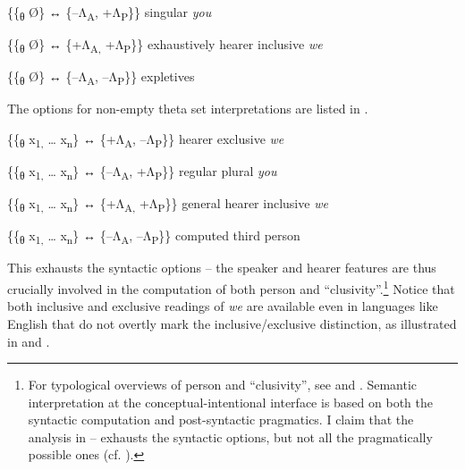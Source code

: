 \documentclass[output=paper]{LSP/langsci}
\begin{document}
\ex  \{\{\textsubscript{θ} Ø\} ↔ \{–Λ\textsubscript{A}, +Λ\textsubscript{P}\}\}  \hspace{2em} singular \textit{you}

\ex  \{\{\textsubscript{θ} Ø\} ↔ \{+Λ\textsubscript{A,} +Λ\textsubscript{P}\}\}  \hspace{2em} exhaustively hearer inclusive \textit{we}

\ex  \{\{\textsubscript{θ} Ø\} ↔ \{–Λ\textsubscript{A}, –Λ\textsubscript{P}\}\}  \hspace{2em} expletives
\z
\z

The options for non-empty theta set interpretations are listed in .

\ea%
    \label{ex:Sigurdsson:31}
\ea  \{\{\textsubscript{θ} x\textsubscript{1,} … x\textsubscript{n}\} ↔ \{+Λ\textsubscript{A}, –Λ\textsubscript{P}\}\} \hspace{2em} hearer exclusive \textit{we}

\ex  \{\{\textsubscript{θ} x\textsubscript{1,} … x\textsubscript{n}\} ↔ \{–Λ\textsubscript{A}, +Λ\textsubscript{P}\}\} \hspace{2em} regular plural \textit{you}

\ex  \{\{\textsubscript{θ} x\textsubscript{1,} … x\textsubscript{n}\} ↔ \{+Λ\textsubscript{A,} +Λ\textsubscript{P}\}\} \hspace{2em} general hearer inclusive \textit{we}

\ex  \{\{\textsubscript{θ} x\textsubscript{1,} … x\textsubscript{n}\} ↔ \{–Λ\textsubscript{A}, –Λ\textsubscript{P}\}\} \hspace{2em} computed third person
\z
\z

This exhausts the syntactic options – the speaker and hearer features are thus crucially involved in the computation of both person and “clusivity”.\footnote{For typological overviews of person and “clusivity”, see \citet{Siewierska2004} and \citet{Cysouw2003}. Semantic interpretation at the conceptual-intentional interface is based on both the syntactic computation and post-syntactic pragmatics. I claim that the analysis in – exhausts the syntactic options, but not all the pragmatically possible ones (cf. \citealt{Bobaljik2008}).} Notice that both inclusive and exclusive readings of \textit{we} are available even in languages like English that do not overtly mark the inclusive/exclusive distinction, as illustrated in  and .
\end{document}
